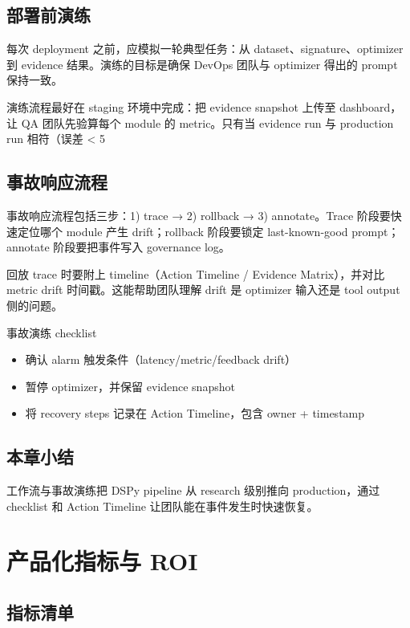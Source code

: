\documentclass[a4paper]{article}
\begin{document}
\subsection{部署前演练}

每次 deployment 之前，应模拟一轮典型任务：从 dataset、signature、optimizer 到 evidence 结果。演练的目标是确保 DevOps 团队与 optimizer 得出的 prompt 保持一致。

演练流程最好在 staging 环境中完成：把 evidence snapshot 上传至 dashboard，让 QA 团队先验算每个 module 的 metric。只有当 evidence run 与 production run 相符（误差 < 5%

\subsection{事故响应流程}

事故响应流程包括三步：1) trace → 2) rollback → 3) annotate。Trace 阶段要快速定位哪个 module 产生 drift；rollback 阶段要锁定 last-known-good prompt；annotate 阶段要把事件写入 governance log。

回放 trace 时要附上 timeline（Action Timeline / Evidence Matrix），并对比 metric drift 时间戳。这能帮助团队理解 drift 是 optimizer 输入还是 tool output 侧的问题。

\begin{importantbox}{事故演练 checklist}
\begin{itemize}
    \item 确认 alarm 触发条件（latency/metric/feedback drift）
    \item 暂停 optimizer，并保留 evidence snapshot
    \item 将 recovery steps 记录在 Action Timeline，包含 owner + timestamp
\end{itemize}
\end{importantbox}

\subsection{本章小结}

工作流与事故演练把 DSPy pipeline 从 research 级别推向 production，通过 checklist 和 Action Timeline 让团队能在事件发生时快速恢复。

\section{产品化指标与 ROI}

\subsection{指标清单}
\end{document}
